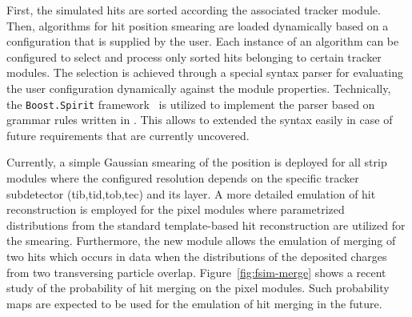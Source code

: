 
First, the simulated hits are sorted according the associated tracker module. Then, algorithms for hit position smearing are loaded dynamically based on a configuration that is supplied by the user. Each instance of an algorithm can be configured to select and process only sorted hits belonging to certain tracker modules. The selection is achieved through a special syntax parser for evaluating the user configuration dynamically against the module properties. Technically, the \texttt{Boost.Spirit} framework~\cite{boostspirit} is utilized to implement the parser based on grammar rules written in . This allows to extended the syntax easily in case of future requirements that are currently uncovered.

Currently, a simple Gaussian smearing of the position is deployed for all strip modules where the configured resolution depends on the specific tracker subdetector (\gls{tib},\gls{tid},\gls{tob},\gls{tec}) and its layer. A more detailed emulation of hit reconstruction is employed for the pixel modules where parametrized distributions from the standard template-based hit reconstruction are utilized for the smearing. Furthermore, the new module allows the emulation of merging of two hits which occurs in data when the distributions of the deposited charges from two transversing particle overlap. Figure~\ref{fig:fsim-merge} shows a recent study of the probability of hit merging on the pixel modules. Such probability maps are expected to be used for the emulation of hit merging in the future.








